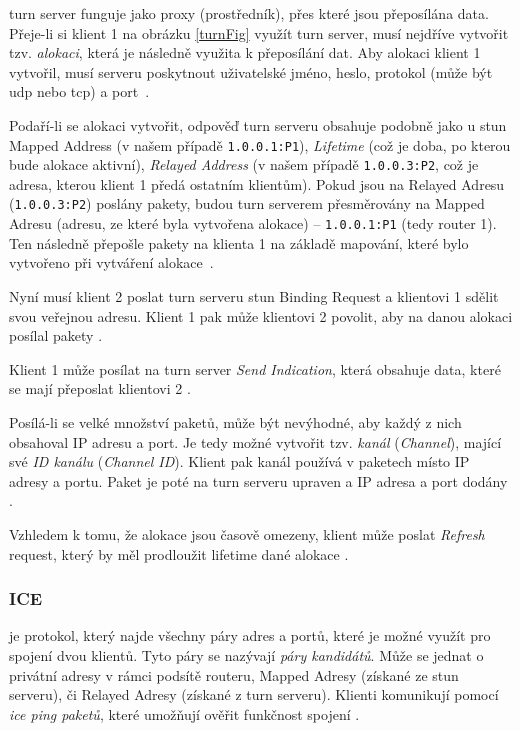 \gls{turn} server funguje jako proxy (prostředník), přes které jsou přeposílána
data. Přeje-li si klient 1 na obrázku \ref{turnFig} využít \gls{turn} server,
musí nejdříve vytvořit tzv. \textit{alokaci}, která je následně využita k
přeposílání dat. Aby alokaci klient 1 vytvořil, musí serveru poskytnout
uživatelské jméno, heslo, protokol (může být \gls{udp} nebo \gls{tcp}) a
port~\parencite{WebRTCForTheCurious}.

Podaří-li se alokaci vytvořit, odpověď \gls{turn} serveru obsahuje podobně jako
u \gls{stun} Mapped Address (v našem případě \texttt{1.0.0.1:P1}),
\textit{Lifetime} (což je doba, po kterou bude alokace aktivní), \textit{Relayed
    Address} (v našem případě \texttt{1.0.0.3:P2}, což je adresa, kterou
klient 1 předá ostatním klientům). Pokud jsou na Relayed Adresu
(\texttt{1.0.0.3:P2}) poslány pakety, budou \gls{turn} serverem
přesměrovány na Mapped Adresu (adresu, ze které byla vytvořena alokace) --
\texttt{1.0.0.1:P1} (tedy router 1). Ten následně přepošle pakety na
klienta 1 na základě mapování, které bylo vytvořeno při vytváření
alokace~\parencite{WebRTCForTheCurious}.

Nyní musí klient 2 poslat \gls{turn} serveru \gls{stun} Binding Request a
klientovi 1 sdělit svou veřejnou adresu. Klient 1 pak může klientovi 2 povolit,
aby na danou alokaci posílal pakety \parencite{WebRTCForTheCurious}.

Klient 1 může posílat na \gls{turn} server \textit{Send Indication}, která
obsahuje data, které se mají přeposlat klientovi 2
\parencite{WebRTCForTheCurious}.

Posílá-li se velké množství paketů, může být nevýhodné, aby každý z nich
obsahoval IP adresu a port. Je tedy možné vytvořit tzv. \textit{kanál}
(\textit{Channel}), mající své \textit{ID kanálu} (\textit{Channel ID}). Klient
pak kanál používá v paketech místo IP adresy a portu. Paket je poté na
\gls{turn} serveru upraven a IP adresa a port dodány
\parencite{WebRTCForTheCurious}.

Vzhledem k tomu, že alokace jsou časově omezeny, klient může poslat
\textit{Refresh} request, který by měl prodloužit lifetime dané alokace
\parencite{WebRTCForTheCurious}.

\subsubsection{ICE}\label{ice}

 je protokol, který najde všechny páry adres a portů, které je
možné využít pro spojení dvou klientů. Tyto páry se nazývají \textit{páry
    kandidátů}. Může se jednat o privátní adresy v rámci podsítě routeru, Mapped
Adresy (získané ze \gls{stun} serveru), či Relayed Adresy (získané z \gls{turn}
serveru). Klienti komunikují pomocí \textit{\gls{ice} ping paketů}, které
umožňují ověřit funkčnost spojení \parencite{WebRTCForTheCurious}.

